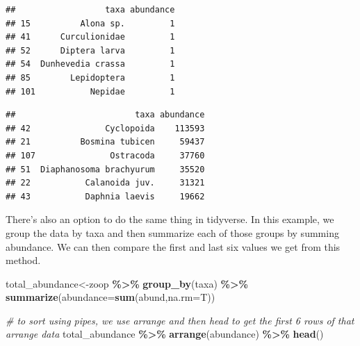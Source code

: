 \documentclass[
]{article}
\newenvironment{Shaded}{\begin{snugshade}}{\end{snugshade}}
\newcommand{\AttributeTok}[1]{\textcolor[rgb]{0.13,0.29,0.53}{#1}}
\newcommand{\CommentTok}[1]{\textcolor[rgb]{0.56,0.35,0.01}{\textit{#1}}}
\newcommand{\FunctionTok}[1]{\textcolor[rgb]{0.13,0.29,0.53}{\textbf{#1}}}
\newcommand{\NormalTok}[1]{#1}
\newcommand{\OtherTok}[1]{\textcolor[rgb]{0.56,0.35,0.01}{#1}}
\newcommand{\SpecialCharTok}[1]{\textcolor[rgb]{0.81,0.36,0.00}{\textbf{#1}}}
\begin{document}
\begin{verbatim}
##                  taxa abundance
## 15          Alona sp.         1
## 41      Curculionidae         1
## 52      Diptera larva         1
## 54  Dunhevedia crassa         1
## 85        Lepidoptera         1
## 101           Nepidae         1
\end{verbatim}

\begin{Shaded}
\end{Shaded}

\begin{verbatim}
##                        taxa abundance
## 42               Cyclopoida    113593
## 21          Bosmina tubicen     59437
## 107               Ostracoda     37760
## 51  Diaphanosoma brachyurum     35520
## 22           Calanoida juv.     31321
## 43           Daphnia laevis     19662
\end{verbatim}

There's also an option to do the same thing in tidyverse. In this
example, we group the data by taxa and then summarize each of those
groups by summing abundance. We can then compare the first and last six
values we get from this method.

\begin{Shaded}
\begin{Highlighting}[]
\NormalTok{total\_abundance}\OtherTok{\textless{}{-}}\NormalTok{zoop }\SpecialCharTok{\%\textgreater{}\%} \FunctionTok{group\_by}\NormalTok{(taxa) }\SpecialCharTok{\%\textgreater{}\%}
  \FunctionTok{summarize}\NormalTok{(}\AttributeTok{abundance=}\FunctionTok{sum}\NormalTok{(abund,}\AttributeTok{na.rm=}\NormalTok{T))}

\CommentTok{\# to sort using pipes, we use arrange and then head to get the first 6 rows of that arrange data}
\NormalTok{total\_abundance }\SpecialCharTok{\%\textgreater{}\%} \FunctionTok{arrange}\NormalTok{(abundance) }\SpecialCharTok{\%\textgreater{}\%} \FunctionTok{head}\NormalTok{()}
\end{Highlighting}
\end{Shaded}
\end{document}
